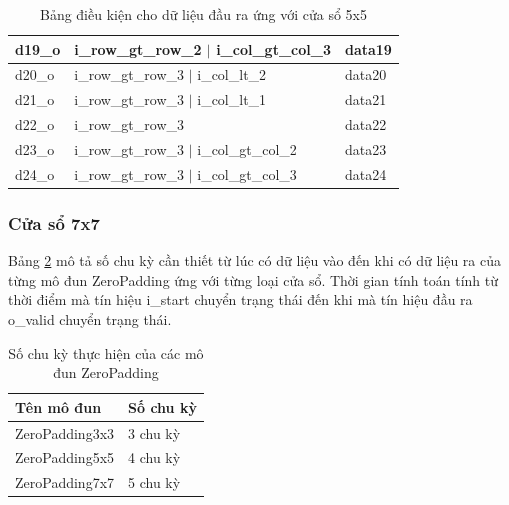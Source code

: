 \begin{table}[!ht]
\begin{tabular}{|p{2.2cm} p{7cm} p{4cm}|}
      d19\_o & i\_row\_gt\_row\_2 $\vert$ i\_col\_gt\_col\_3 & data19 \\ \hline
      d20\_o & i\_row\_gt\_row\_3 $\vert$ i\_col\_lt\_2     & data20 \\ \hline
      d21\_o & i\_row\_gt\_row\_3 $\vert$ i\_col\_lt\_1     & data21 \\ \hline
      d22\_o & i\_row\_gt\_row\_3                           & data22 \\ \hline
      d23\_o & i\_row\_gt\_row\_3 $\vert$ i\_col\_gt\_col\_2 & data23 \\ \hline
      d24\_o & i\_row\_gt\_row\_3 $\vert$ i\_col\_gt\_col\_3 & data24 \\ \hline
    \end{tabular}
    \caption{Bảng điều kiện cho dữ liệu đầu ra ứng với cửa sổ 5x5}
    \label{tab:conditionForOutputZero5x5}
\end{table}

\newpage
\subsubsection{Cửa sổ 7x7}
Bảng \ref{tab:numberOfCycleZeroPadding} mô tả số chu kỳ cần thiết từ lúc có dữ liệu vào đến khi có dữ liệu ra của từng mô đun ZeroPadding ứng với từng loại cửa sổ. Thời gian tính toán tính từ thời điểm mà tín hiệu i\_start chuyển trạng thái đến khi mà tín hiệu đầu ra o\_valid chuyển trạng thái.
\begin{table}[H]
	\centering
	\renewcommand{\arraystretch}{1.3}
	\begin{tabular}{|p{5cm} p{5cm} |}
		\hline
		\rowcolor{gray!30}
		\textbf{Tên mô đun} & \textbf{Số chu kỳ}  \\
		\hline
		ZeroPadding3x3  & 3 chu kỳ
		\\ \hline
		ZeroPadding5x5 & 4 chu kỳ
		\\ \hline
		ZeroPadding7x7 & 5 chu kỳ
		\\ \hline
	\end{tabular}
	\caption{Số chu kỳ thực hiện của các mô đun ZeroPadding}
	\label{tab:numberOfCycleZeroPadding}
\end{table}


